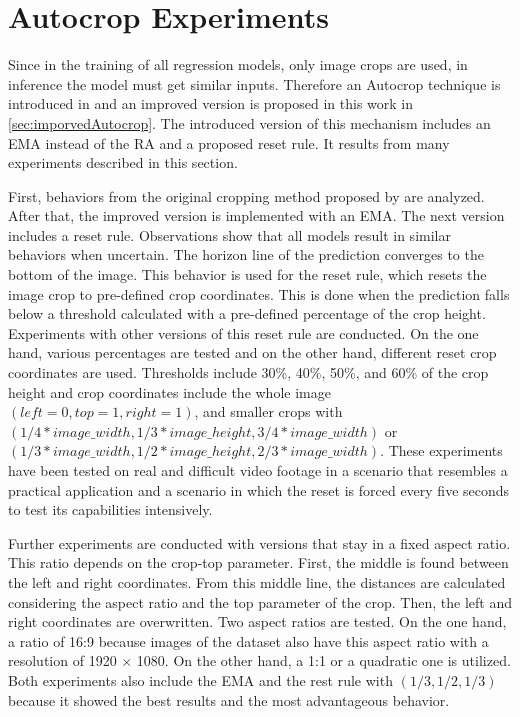 \section{Autocrop Experiments}

Since in the training of all regression models, only image crops are used, in inference the model must get similar inputs.
Therefore an Autocrop technique is introduced in \cite{tepNet2024} and an improved version is proposed in this work in \autoref{sec:imporvedAutocrop}.
The introduced version of this mechanism includes an \ac{EMA} instead of the \ac{RA} and a proposed reset rule.
It results from many experiments described in this section.

First, behaviors from the original cropping method proposed by \cite{tepNet2024} are analyzed.
After that, the improved version is implemented with an \ac{EMA}.
The next version includes a reset rule.
Observations show that all models result in similar behaviors when uncertain.
The horizon line of the prediction converges to the bottom of the image.
This behavior is used for the reset rule, which resets the image crop to pre-defined crop coordinates.
This is done when the prediction falls below a threshold calculated with a pre-defined percentage of the crop height.
Experiments with other versions of this reset rule are conducted.
On the one hand, various percentages are tested and on the other hand, different reset crop coordinates are used.
Thresholds include 30\%, 40\%, 50\%, and 60\% of the crop height and crop coordinates include the whole image $(left=0, top=1, right=1)$, and smaller crops with $(1/4*image\_width, 1/3*image\_height, 3/4*image\_width)$ or $(1/3*image\_width, 1/2*image\_height, 2/3*image\_width)$.
These experiments have been tested on real and difficult video footage in a scenario that resembles a practical application and a scenario in which the reset is forced every five seconds to test its capabilities intensively.

Further experiments are conducted with versions that stay in a fixed aspect ratio.
This ratio depends on the crop-top parameter.
First, the middle is found between the left and right coordinates.
From this middle line, the distances are calculated considering the aspect ratio and the top parameter of the crop.
Then, the left and right coordinates are overwritten.
Two aspect ratios are tested.
On the one hand, a ratio of 16:9 because images of the dataset also have this aspect ratio with a resolution of 1920 $\times$ 1080.
On the other hand, a 1:1 or a quadratic one is utilized.
Both experiments also include the \ac{EMA} and the rest rule with $(1/3, 1/2, 1/3)$ because it showed the best results and the most advantageous behavior.

